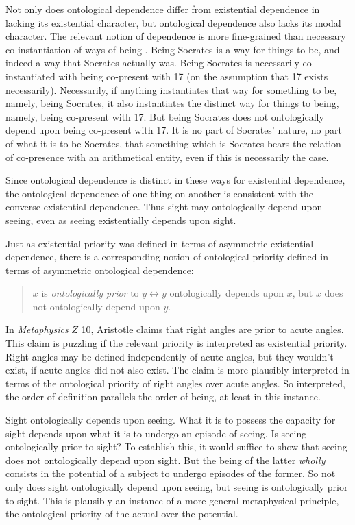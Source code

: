 \documentclass[12pt]{article}
\begin{document}
Not only does ontological dependence differ from existential dependence in lacking its existential character, but ontological dependence also lacks its modal character. The relevant notion of dependence is more fine-grained than necessary co-instantiation of ways of being \citep[see][]{Fine:1994uq,Fine:1995ls,Rosen:2010kx}. Being Socrates is a way for things to be, and indeed a way that Socrates actually was. Being Socrates is necessarily co-instantiated with being co-present with 17 (on the assumption that 17 exists necessarily). Necessarily, if anything instantiates that way for something to be, namely, being Socrates, it also instantiates the distinct way for things to being, namely, being co-present with 17. But being Socrates does not ontologically depend upon being co-present with 17. It is no part of Socrates' nature, no part of what it is to be Socrates, that something which is Socrates bears the relation of co-presence with an arithmetical entity, even if this is necessarily the case.

Since ontological dependence is distinct in these ways for existential dependence, the ontological dependence of one thing on another is consistent with the converse existential dependence. Thus sight may ontologically depend upon seeing, even as seeing existentially depends upon sight.

Just as existential priority was defined in terms of asymmetric existential dependence, there is a corresponding notion of ontological priority defined in terms of asymmetric ontological dependence:
\begin{quote}
	\( x \) is \emph{ontologically prior} to \( y  \leftrightarrow  y \) ontologically depends upon \( x \), but \( x \) does not ontologically depend upon \( y \).
\end{quote}
In \emph{Metaphysics} \( Z \) 10, Aristotle claims that right angles are prior to acute angles. This claim is puzzling if the relevant priority is interpreted as existential priority. Right angles may be defined independently of acute angles, but they wouldn't exist, if acute angles did not also exist. The claim is more plausibly interpreted in terms of the ontological priority of right angles over acute angles. So interpreted, the order of definition parallels the order of being, at least in this instance.

Sight ontologically depends upon seeing. What it is to possess the capacity for sight depends upon what it is to undergo an episode of seeing. Is seeing ontologically prior to sight? To establish this, it would suffice to show that seeing does not ontologically depend upon sight. But the being of the latter \emph{wholly} consists in the potential of a subject to undergo episodes of the former. So not only does sight ontologically depend upon seeing, but seeing is ontologically prior to sight. This is plausibly an instance of a more general metaphysical principle, the ontological priority of the actual over the potential.
\end{document}

